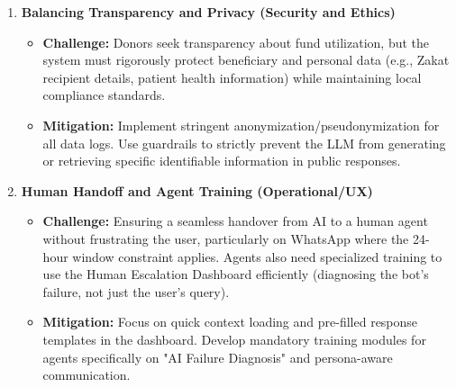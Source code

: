 \begin{enumerate}
    \item \textbf{Balancing Transparency and Privacy (Security and Ethics)}
    \begin{itemize}
        \item \textbf{Challenge:} Donors seek transparency about fund utilization, but the system must rigorously protect beneficiary and personal data (e.g., Zakat recipient details, patient health information) while maintaining local compliance standards.
        \item \textbf{Mitigation:} Implement stringent anonymization/pseudonymization for all data logs. Use guardrails to strictly prevent the LLM from generating or retrieving specific identifiable information in public responses.
    \end{itemize}

    \item \textbf{Human Handoff and Agent Training (Operational/UX)}
    \begin{itemize}
        \item \textbf{Challenge:} Ensuring a seamless handover from AI to a human agent without frustrating the user, particularly on WhatsApp where the 24-hour window constraint applies. Agents also need specialized training to use the Human Escalation Dashboard efficiently (diagnosing the bot's failure, not just the user's query).
        \item \textbf{Mitigation:} Focus on quick context loading and pre-filled response templates in the dashboard. Develop mandatory training modules for agents specifically on "AI Failure Diagnosis" and persona-aware communication.
    \end{itemize}
\end{enumerate}